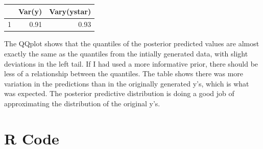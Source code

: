 \documentclass{article}\usepackage[]{graphicx}\usepackage[]{color}
\begin{document}
\begin{enumerate}
\begin{enumerate}
{}


\begin{table}[ht]
\centering
\begin{tabular}{rrr}
  \hline
 & Var(y) & Vary(ystar) \\ 
  \hline
1 & 0.91 & 0.93 \\ 
   \hline
\end{tabular}
\end{table}


The QQplot shows that the quantiles of the posterior predicted values are almost exactly the same as the quantiles from the intially generated data, with slight deviations in the left tail. If I had used a more informative prior, there should be less of a relationship between the quantiles. The table shows there was more variation in the predictions than in the originally generated y's, which is what was expected. The posterior predictive distribution is doing a good job of approximating the distribution of the original y's.
    

\end{enumerate}

\end{enumerate}

\appendix
\section*{R Code}
\end{document}
